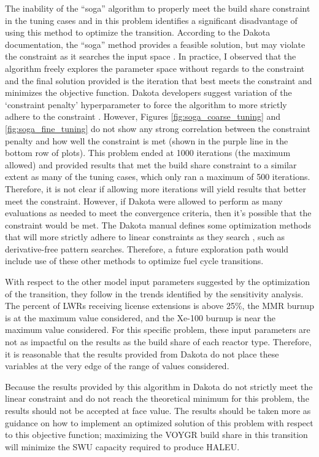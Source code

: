 The inability of the ``soga'' algorithm to properly meet the build share 
constraint in the tuning cases and in this problem identifies a significant 
disadvantage of using this method to optimize the transition. According to the 
Dakota documentation, the ``soga'' method provides a feasible solution, but
may violate the constraint as it searches the input space \cite{noauthor_dakota_2021}.
In practice, I observed that the algorithm freely explores the parameter space 
without regards to the constraint and the final solution provided is the 
iteration that best meets the constraint and minimizes the objective function.
Dakota developers suggest variation of the `constraint penalty' hyperparameter 
to force the algorithm to more strictly adhere to the constraint 
\cite{noauthor_optimization_2023}. 
However, Figures \ref{fig:soga_coarse_tuning} and \ref{fig:soga_fine_tuning}
do not show any strong correlation between the constraint penalty and how 
well the constraint is met (shown in the purple line in the bottom row of 
plots). This problem ended at 1000 iterations (the maximum allowed) and 
provided results that met the build share constraint to a similar 
extent as many of the tuning cases, which only ran a maximum of 500 iterations. 
Therefore, it is not clear if allowing more iterations will yield results that 
better meet the constraint. However, if Dakota were allowed to perform 
as many evaluations as needed to meet the convergence criteria, then 
it's possible that the constraint would be met. The Dakota manual defines some optimization 
methods that will more strictly adhere to linear constraints as they search
\cite{noauthor_dakota_2021}, such as derivative-free pattern searches. 
Therefore, a future exploration path would include use of these other 
methods to optimize fuel cycle transitions. 

With respect to the other model input parameters suggested by the optimization 
of the transition, they follow in the trends identified by the 
sensitivity analysis. The percent of \glspl{LWR} receiving license extensions
is above 25\%, the \gls{MMR} burnup is at the maximum value considered, 
and the Xe-100 burnup is near the maximum value considered. For this specific 
problem, these input parameters are not as impactful on the results as the 
build share of each reactor type. Therefore, it is reasonable that the 
results provided from Dakota do not place these variables at the very 
edge of the range of values considered. 

Because the results provided by this algorithm in Dakota do not strictly 
meet the linear constraint and do not reach the theoretical minimum for 
this problem, the results should not be accepted at face value. The results should 
be taken more as guidance on how to implement an optimized solution of 
this problem 
with respect to this objective function; maximizing the VOYGR build share in 
this transition will minimize the \gls{SWU} capacity required to produce \gls{HALEU}.

